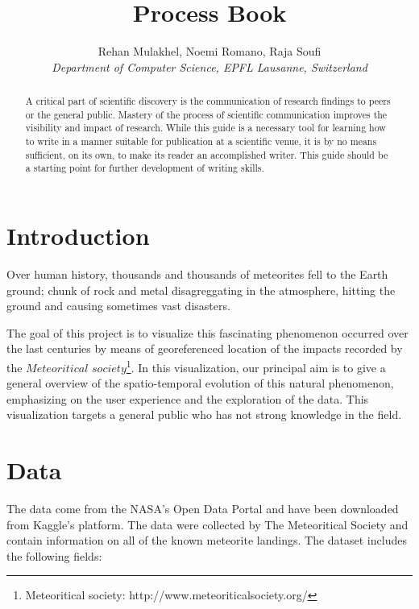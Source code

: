 \documentclass[10pt,conference,compsocconf]{IEEEtran}
\begin{document}
\title{Process Book}

\author{
  Rehan Mulakhel, Noemi Romano, Raja Soufi\\
  \textit{Department of Computer Science, EPFL Lausanne, Switzerland}
}

\maketitle

\begin{abstract}
A critical part of scientific discovery is the communication of research findings to peers or the general public. Mastery of the process of scientific communication improves the visibility and impact of research. While this guide is a necessary tool for learning how to write in a manner suitable for publication at a scientific venue, it is by no means sufficient, on its own, to make its reader an accomplished writer. This guide should be a starting point for further development of writing skills.
\end{abstract}

\section{Introduction}

Over human history, thousands and thousands of meteorites fell to the Earth ground; chunk of rock and metal disagreggating in the atmosphere, hitting the ground and causing sometimes vast disasters. 

The goal of this project is to visualize this fascinating phenomenon occurred over the last centuries by means of georeferenced location of the impacts recorded by the $Meteoritical$ $society$\footnote{Meteoritical society: http://www.meteoriticalsociety.org/}. In this visualization, our principal aim is to give a general overview of the spatio-temporal evolution of this natural phenomenon, emphasizing on the user experience and the exploration of the data. This visualization targets a general public who has not strong knowledge in the field. 


\section{Data}
\label{sec:data}
The data come from the NASA’s Open Data Portal and have been downloaded from Kaggle’s platform. The data were collected by The Meteoritical Society and contain information on all of the known meteorite landings. The dataset includes the following fields:
\end{document}
